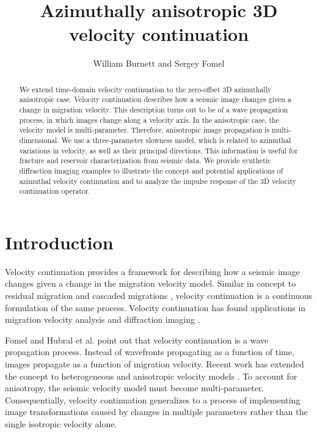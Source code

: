 
\title{Azimuthally anisotropic 3D velocity continuation}


\renewcommand{\thefootnote}{\fnsymbol{footnote}} 

\author{William Burnett and Sergey Fomel}

\maketitle

\begin{abstract}
We extend time-domain velocity continuation to the zero-offset 3D azimuthally anisotropic case.  
Velocity continuation describes how a seismic image changes given a change in migration velocity.  
This description turns out to be of a wave propagation process, in which images change along a velocity axis.  
In the anisotropic case, the velocity model is multi-parameter. 
Therefore, anisotropic image propagation is multi-dimensional.  
We use a three-parameter slowness model, which is related to azimuthal variations in velocity, as well as their principal directions.  
This information is useful for fracture and reservoir characterization from seismic data.  
We provide synthetic diffraction imaging examples to illustrate the concept and potential applications of azimuthal velocity continuation and to analyze the impulse response of the 3D velocity continuation operator.
\end{abstract}

\section{Introduction}

Velocity continuation \cite{fomel94, GEO68-05-16501661} provides a framework for describing how a seismic image changes given a change in the migration velocity model.  
Similar in concept to residual migration \cite[]{GEO50-01-01100126} and cascaded migrations \cite[]{GEO52-05-06180643}, velocity continuation is a continuous formulation of the same process.  
Velocity continuation has found applications in migration velocity analysis \cite[]{GEO68-05-16621672, schleicher_etal08a} and diffraction imaging \cite[]{novais_etal06, fomel_landa_taner07}.


Fomel \cite{fomel94} and Hubral et al. \cite{hubral_etal96} point out that velocity continuation is a wave propagation process.  
Instead of wavefronts propagating as a function of time, images propagate as a function of migration velocity.  
Recent work has extended the concept to heterogeneous and anisotropic velocity models \cite[]{Alkhalifah.sep.94.tariq3, GEO67-01-01260134, iversen06, schleicher_alexio07, schleicher_etal08b, duchkov_dehoop09}.  
To account for anisotropy, the seismic velocity model must become multi-parameter.  
Consequentially, velocity continuation generalizes to a process of implementing image transformations caused by changes in multiple parameters rather than the single isotropic velocity alone.

